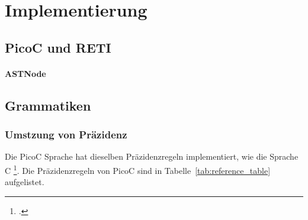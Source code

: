 \chapter{Implementierung}
\section{PicoC und RETI}
\subsubsection{ASTNode}
\section{Grammatiken}
\subsection{Umstzung von Präzidenz}
Die PicoC Sprache hat dieselben Präzidenzregeln implementiert, wie die Sprache C \footcite{noauthor_c_nodate}. Die Präzidenzregeln von PicoC sind in Tabelle~\ref{tab:reference_table} aufgelistet.

